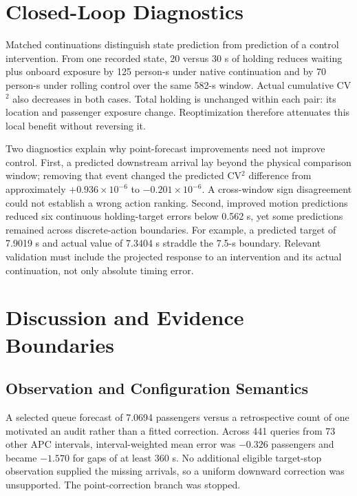 \section{Closed-Loop Diagnostics}
\label{sec:diagnostics}

Matched continuations distinguish state prediction from prediction of a
control intervention. From one recorded state, 20 versus 30 s of holding
reduces waiting plus onboard exposure by 125 person-s under native
continuation and by 70 person-s under rolling control over the same 582-s
window. Actual cumulative CV$^2$ also decreases in both cases. Total holding
is unchanged within each pair: its location and passenger exposure change.
Reoptimization therefore attenuates this local benefit without reversing it.

Two diagnostics explain why point-forecast improvements need not improve
control. First, a predicted downstream arrival lay beyond the physical
comparison window; removing that event changed the predicted CV$^2$ difference
from approximately $+0.936\times10^{-6}$ to $-0.201\times10^{-6}$. A
cross-window sign disagreement could not establish a wrong action ranking.
Second, improved motion predictions reduced six continuous holding-target
errors below 0.562 s, yet some predictions remained across discrete-action
boundaries. For example, a predicted target of 7.9019 s and actual value of
7.3404 s straddle the 7.5-s boundary. Relevant validation must include the
projected response to an intervention and its actual continuation, not only
absolute timing error.

\section{Discussion and Evidence Boundaries}
\label{sec:discussion}

\subsection{Observation and Configuration Semantics}

A selected queue forecast of 7.0694 passengers versus a retrospective count
of one motivated an audit rather than a fitted correction. Across 441 queries
from 73 other APC intervals, interval-weighted mean error was $-0.326$
passengers and became $-1.570$ for gaps of at least 360 s. No additional eligible
target-stop observation supplied the missing arrivals, so a uniform downward
correction was unsupported. The point-correction branch was stopped.

